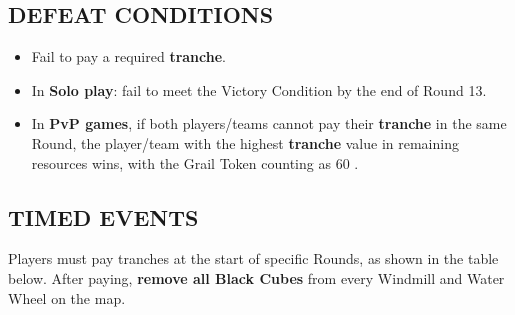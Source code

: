 \begin{multicols*}{2}
\subsection*{\MakeUppercase{Defeat Conditions}}

\begin{itemize}
  \item Fail to pay a required \textbf{tranche}.
  \item In \textbf{Solo play}: fail to meet the Victory Condition by the end of Round 13.
  \item In \textbf{PvP games}, if both players/teams cannot pay their \textbf{tranche} in the same Round, the player/team with the highest \textbf{tranche} value in remaining resources wins, with the Grail Token counting as 60 .
\end{itemize}

\subsection*{\MakeUppercase{Timed Events}}

Players must pay tranches at the start of specific Rounds, as shown in the table below. After paying, \textbf{remove all Black Cubes} from every Windmill and Water Wheel on the map.




\end{multicols*}


